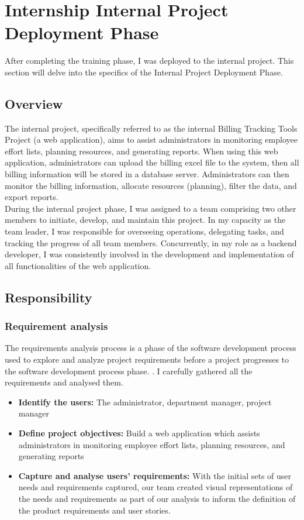 \section{Internship Internal Project Deployment Phase}
After completing the training phase, I was deployed to the internal project. This section will delve into the specifics of the Internal Project Deployment Phase.

\subsection{Overview}
The internal project, specifically referred to as the internal Billing Tracking Tools Project (a web application), aims to assist administrators in monitoring employee effort lists, planning resources, and generating reports. When using this web application, administrators can upload the billing excel file to the system, then all billing information will be stored in a database server. Administrators can then monitor the billing information, allocate resources (planning), filter the data, and export reports. \\

\noindent During the internal project phase, I was assigned to a team comprising two other members to initiate, develop, and maintain this project. In my capacity as the team leader, I was responsible for overseeing operations, delegating tasks, and tracking the progress of all team members. Concurrently, in my role as a backend developer, I was consistently involved in the development and implementation of all functionalities of the web application.

\subsection{Responsibility}

    \subsubsection{Requirement analysis}
    The requirements analysis process is a phase of the software development process used to explore and analyze project requirements before a project progresses to the software development process phase. \cite{requirement_analysis}. I carefully gathered all the requirements and analysed them.

    \begin{itemize}
        \item \textbf{Identify the users:} The administrator, department manager, project manager
        \item \textbf{Define project objectives:} Build a web application which assists administrators in monitoring employee effort lists, planning resources, and generating reports 
        \item \textbf{Capture and analyse users' requirements: } With the initial sets of user needs and requirements captured, our team created visual representations of the needs and requirements as part of our analysis to inform the definition of the product requirements and user stories.
    \end{itemize}


